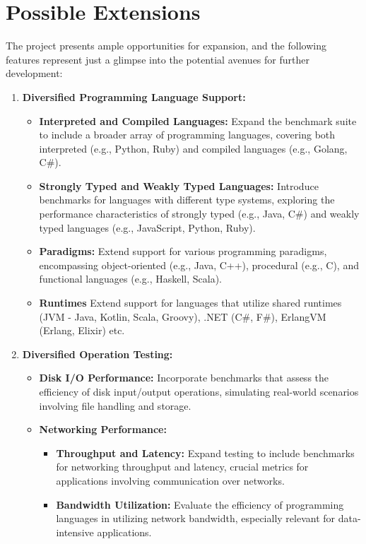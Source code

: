 \documentclass{article}
\begin{document}
\section{Possible Extensions}
The project presents ample opportunities for expansion, and the following features represent just a glimpse into the potential avenues for further development:
\begin{enumerate}
    \item \textbf{Diversified Programming Language Support:}
    \begin{itemize}
        \item \textbf{Interpreted and Compiled Languages:} Expand the benchmark suite to include a broader array of programming languages, covering both interpreted (e.g., Python, Ruby) and compiled languages (e.g., Golang, C\#).
        \item \textbf{Strongly Typed and Weakly Typed Languages:} Introduce benchmarks for languages with different type systems, exploring the performance characteristics of strongly typed (e.g., Java, C\#) and weakly typed languages (e.g., JavaScript, Python, Ruby).
        \item \textbf{Paradigms:} Extend support for various programming paradigms, encompassing object-oriented (e.g., Java, C++), procedural (e.g., C), and functional languages (e.g., Haskell, Scala).
        \item \textbf{Runtimes} Extend support for languages that utilize shared runtimes (JVM - Java, Kotlin, Scala, Groovy), .NET (C\#, F\#), ErlangVM (Erlang, Elixir) etc. 
    \end{itemize}
    
    \item \textbf{Diversified Operation Testing:}
    \begin{itemize}
        \item \textbf{Disk I/O Performance:} Incorporate benchmarks that assess the efficiency of disk input/output operations, simulating real-world scenarios involving file handling and storage.
        \item \textbf{Networking Performance:}
            \begin{itemize}
                \item \textbf{Throughput and Latency:} Expand testing to include benchmarks for networking throughput and latency, crucial metrics for applications involving communication over networks.
                \item \textbf{Bandwidth Utilization:} Evaluate the efficiency of programming languages in utilizing network bandwidth, especially relevant for data-intensive applications.
            \end{itemize}
    \end{itemize}
    

\end{enumerate}
\end{document}
